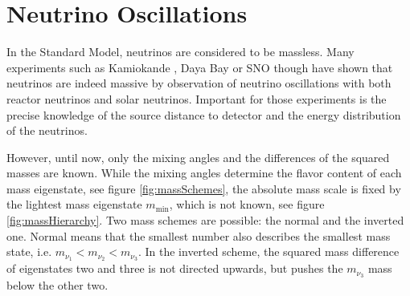     
   
    
    \section{Neutrino Oscillations}
    \label{ch:Introduction:sec:neutrino Oscillations}
     In the Standard Model, neutrinos are considered to be massless. 
    Many experiments such as Kamiokande \cite{PhysRevLett.110.181802}, Daya Bay \cite{dayaBay2} or SNO \cite{SNOOscillations} though have shown that neutrinos are indeed massive by observation of neutrino oscillations with both reactor neutrinos and solar neutrinos.
    Important for those experiments is the precise knowledge of the source distance to detector and the energy distribution of the neutrinos.
    
    However, until now, only the mixing angles and the differences of the squared masses are known. While the mixing angles determine the flavor content of each mass eigenstate, see figure \ref{fig:massSchemes}, the absolute mass scale is fixed by the lightest mass eigenstate $m_{\text{min}}$, which is not known, see figure \ref{fig:massHierarchy}. Two mass schemes are possible: the normal and the inverted one. Normal means that the smallest number also describes the smallest mass state, i.e. $m_{\nu_1} < m_{\nu_2} < m_{\nu_3}$. In the inverted scheme, the squared mass difference of eigenstates two and three is not directed upwards, but pushes the $m_{\nu_3}$ mass below the other two.
    
